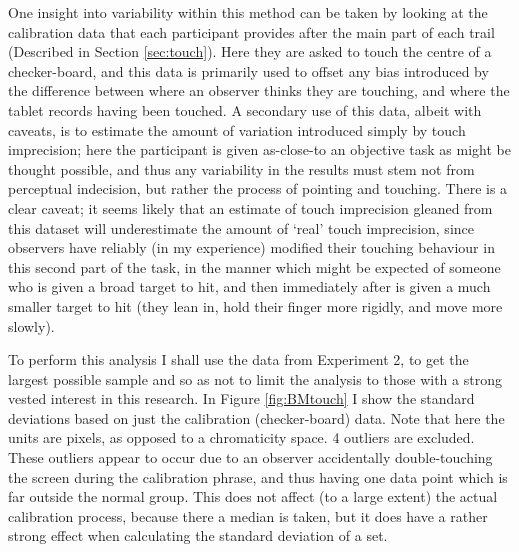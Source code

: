 One insight into variability within this method can be taken by looking at the calibration data that each participant provides after the main part of each trail (Described in Section \ref{sec:touch}). Here they are asked to touch the centre of a checker-board, and this data is primarily used to offset any bias introduced by the difference between where an observer thinks they are touching, and where the tablet records having been touched. A secondary use of this data, albeit with caveats, is to estimate the amount of variation introduced simply by touch imprecision; here the participant is given as-close-to an objective task as might be thought possible, and thus any variability in the results must stem not from perceptual indecision, but rather the process of pointing and touching. There is a clear caveat; it seems likely that an estimate of touch imprecision gleaned from this dataset will underestimate the amount of `real' touch imprecision, since observers have reliably (in my experience) modified their touching behaviour in this second part of the task, in the manner which might be expected of someone who is given a broad target to hit, and then immediately after is given a much smaller target to hit (they lean in, hold their finger more rigidly, and move more slowly).

To perform this analysis I shall use the data from Experiment 2, to get the largest possible sample and so as not to limit the analysis to those with a strong vested interest in this research. In Figure \ref{fig:BMtouch} I show the standard deviations based on just the calibration (checker-board) data. Note that here the units are pixels, as opposed to a chromaticity space. 4 outliers are excluded. These outliers appear to occur due to an observer accidentally double-touching the screen during the calibration phrase, and thus having one data point which is far outside the normal group. This does not affect (to a large extent) the actual calibration process, because there a median is taken, but it does have a rather strong effect when calculating the standard deviation of a set.

